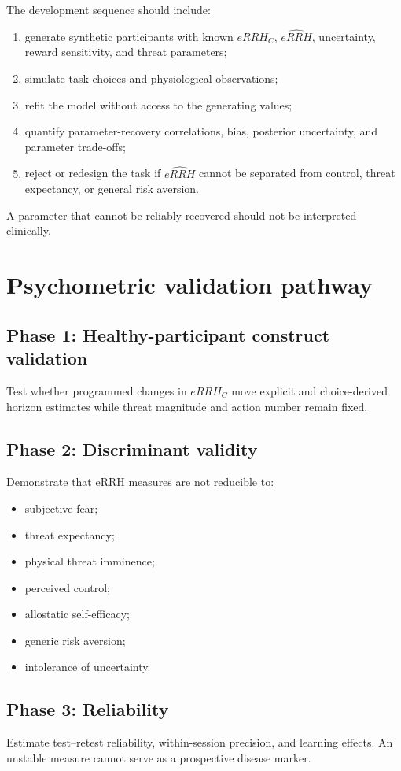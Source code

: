 \documentclass[11pt]{article}
\begin{document}
The development sequence should include:
\begin{enumerate}[leftmargin=2em]
\item generate synthetic participants with known $eRRH_C$, $\widehat{eRRH}$, uncertainty, reward sensitivity, and threat parameters;
\item simulate task choices and physiological observations;
\item refit the model without access to the generating values;
\item quantify parameter-recovery correlations, bias, posterior uncertainty, and parameter trade-offs;
\item reject or redesign the task if $\widehat{eRRH}$ cannot be separated from control, threat expectancy, or general risk aversion.
\end{enumerate}

A parameter that cannot be reliably recovered should not be interpreted clinically.

\section{Psychometric validation pathway}
\subsection{Phase 1: Healthy-participant construct validation}
Test whether programmed changes in $eRRH_C$ move explicit and choice-derived horizon estimates while threat magnitude and action number remain fixed.

\subsection{Phase 2: Discriminant validity}
Demonstrate that eRRH measures are not reducible to:
\begin{itemize}[leftmargin=2em]
\item subjective fear;
\item threat expectancy;
\item physical threat imminence;
\item perceived control;
\item allostatic self-efficacy;
\item generic risk aversion;
\item intolerance of uncertainty.
\end{itemize}

\subsection{Phase 3: Reliability}
Estimate test--retest reliability, within-session precision, and learning effects. An unstable measure cannot serve as a prospective disease marker.
\end{document}
